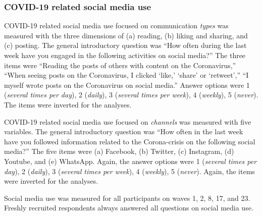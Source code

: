 \documentclass[
  english,
  man,mask,floatsintext]{apa6}
\begin{document}
\hypertarget{covid-19-related-social-media-use}{%
\subsubsection{COVID-19 related social media use}\label{covid-19-related-social-media-use}}

COVID-19 related social media use focused on communication \emph{types} was measured with the three dimensions of (a) reading, (b) liking and sharing, and (c) posting.
The general introductory question was ``How often during the last week have you engaged in the following activities on social media?''
The three items were ``Reading the posts of others with content on the Coronavirus,'' ``When seeing posts on the Coronavirus, I clicked `like,' `share' or `retweet','' ``I myself wrote posts on the Coronavirus on social media.''
Answer options were 1 (\emph{several times per day}), 2 (\emph{daily}), 3 (\emph{several times per week}), 4 (\emph{weekly}), 5 (\emph{never}).
The items were inverted for the analyses.

COVID-19 related social media use focused on \emph{channels} was measured with five variables.
The general introductory question was ``How often in the last week have you followed information related to the Corona-crisis on the following social media?''
The five items were (a) Facebook, (b) Twitter, (c) Instagram, (d) Youtube, and (e) WhatsApp.
Again, the answer options were 1 (\emph{several times per day}), 2 (\emph{daily}), 3 (\emph{several times per week}), 4 (\emph{weekly}), 5 (\emph{never}).
Again, the items were inverted for the analyses.

Social media use was measured for all participants on waves 1, 2, 8, 17, and 23.
Freshly recruited respondents always answered all questions on social media use.
\end{document}

